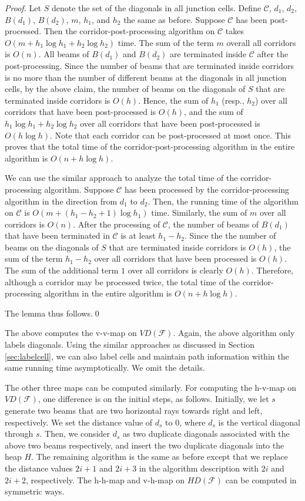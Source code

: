 \documentclass[english,runningheads,11pt]{llncs-revised}
\def\calF{\mathcal{F}}
\def\calC{\mathcal{C}}
\newcommand{\vtd}{\mbox{$V\!D$}}
\newcommand{\htd}{\mbox{$H\!D$}}
\begin{document}
\begin{proof}
Let $S$ denote the set of the diagonals in all junction cells.
Define $\calC$, $d_1$, $d_2$, $B(d_1)$, $B(d_2)$, $m$, $h_1$, and $h_2$ the same as before. Suppose
$\calC$ has been post-processed. Then the
corridor-post-processing algorithm on $\calC$ takes
$O(m+h_1\log h_1+h_2\log h_2)$ time. The sum of the term $m$ overall all
corridors is $O(n)$. All beams of $B(d_1)$ and $B(d_2)$ are terminated
inside $\calC$ after the post-processing. Since the number of beams that are terminated inside corridors is no more than the number of different beams at the diagonals in all junction cells, by the above claim, the number of beams on the
diagonals of $S$ that are terminated inside corridors is $O(h)$. Hence, the sum of
$h_1$ (resp., $h_2$) over all corridors that have been post-processed
is $O(h)$, and the sum of $h_1\log h_1+h_2\log h_2$ over all
corridors that have been post-processed is $O(h\log h)$. Note that
each corridor can be post-processed at most once. This proves
that the total time of the corridor-post-processing algorithm in the
entire algorithm is $O(n+h\log h)$.

We can use the similar approach to analyze the total time of the
corridor-processing algorithm. Suppose $\calC$ has been processed by
the corridor-processing algorithm in
the direction from $d_1$ to $d_2$. Then, the running time of the
algorithm on $\calC$ is $O(m+(h_1-h_2+1)\log h_1)$ time. Similarly,
the sum of $m$ over all corridors is $O(n)$.
After the processing of $\calC$, the number of beams of $B(d_1)$ that
have been terminated in $\calC$ is at least $h_1-h_2$. Since the the number of beams on the
diagonals of $S$ that are terminated inside corridors is $O(h)$, the sum of the term
$h_1-h_2$ over all corridors that have been processed is $O(h)$. The
sum of the additional term $1$ over all corridors is clearly $O(h)$.
Therefore, although a corridor may be processed twice, the total time
of the corridor-processing algorithm in the entire algorithm is
$O(n+h\log h)$.

The lemma thus follows.\qed
\end{proof}


The above computes the v-v-map on $\vtd(\calF)$. Again, the above algorithm only labels diagonals.
Using the similar approaches as discussed in Section \ref{sec:labelcell},
we can also label cells and maintain path information within the same running time asymptotically. We omit the details.

The other three maps can be computed similarly. For computing the
h-v-map on $\vtd(\calF)$, one difference is on the initial steps, as follows. Initially, we let $s$ generate two beams that are two horizontal rays towards right and left, respectively. We set the distance value of $d_s$ to $0$, where $d_s$ is the vertical diagonal through $s$. Then, we consider $d_s$ as two duplicate diagonals associated with the above two beams respectively, and insert the two duplicate diagonals into the heap $H$. The remaining algorithm is the same as before except that we replace the distance values $2i+1$ and $2i+3$ in the algorithm description with $2i$ and $2i+2$, respectively. The h-h-map and v-h-map on $\htd(\calF)$ can be computed in symmetric ways.
\end{document}
